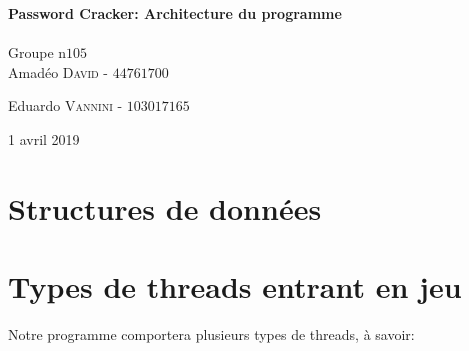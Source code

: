 \documentclass{article}
\begin{document}
\begin{titlepage}
	{\huge\bfseries Password Cracker: Architecture du programme}\\[0.4cm] %
	
	\HRule\\[1.5cm]
	
	
	Groupe n\degree$105$\\[0.2cm]
	Amadéo \textsc{David}  - $44761700$%
	
	Eduardo \textsc{Vannini} - $103017165$%
	
	
	\vfill\vfill\vfill %
	
	{\large 1\ier{} avril 2019} %
	
	
	\vfill %
	
\end{titlepage}


\section{Structures de données}
\label{sec:data_structures}

\section{Types de threads entrant en jeu}
	
	\noindent
	Notre programme comportera plusieurs types de threads, à savoir:
	
\end{document}
